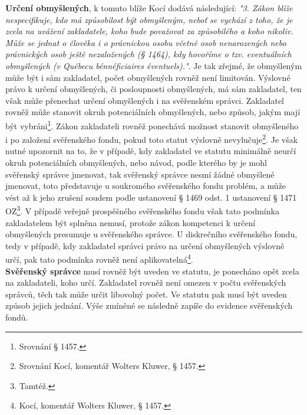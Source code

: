 \documentclass{article}
\begin{document}
\textbf{Určení obmyšlených}, k tomuto blíže Kocí dodává následující: \textit{"3. Zákon blíže nespecifikuje, kdo má způsobilost být obmyšleným, neboť se vychází z toho, že je zcela na uvážení zakladatele, koho bude považovat za způsobilého a koho nikoliv. Může se jednat o člověka i o právnickou osobu včetně osob nenarozených nebo právnických osob ještě nezaložených (§ 1464), kdy hovoříme o tzv. eventuálních obmyšlených (v Québecu bénnéficiaires éventuels)."}. Je tak zřejmé, že obmyšleným může být i sám zakladatel, počet obmyšlených rovněž není limitován. Výslovné právo k určení obmyšlených, či posloupnosti obmyšlených, má sám zakladatel, ten však může přenechat určení obmyšlených i na svěřenském správci. Zakladatel rovněž může stanovit okruh potenciálních obmyšlených, nebo způsob, jakým mají být vybráni\footnote{Srovnání § 1457.}. Zákon zakladateli rovněž ponechává možnost stanovit obmyšleného i po založení svěřenského fondu, pokud toto statut výslovně nevylučuje\footnote{Srovnání Kocí, komentář Wolters Kluwer, § 1457.}. Je však nutné upozornit na to, že v případě, kdy zakladatel ve statutu minimálně neurčí okruh potenciálních obmyšlených, nebo návod, podle kterého by je mohl svěřenský správce jmenovat, tak svěřenský správce nesmí žádné obmyšlené jmenovat, toto představuje u soukromého svěřenského fondu problém, a může vést až k jeho zrušení soudem podle ustanovení § 1469 odst. 1 ustanovení § 1471 OZ\footnote{Tamtéž.}. V případě veřejně prospěšného svěřenského fondu však tato podmínka zakladatelem být splněna nemusí, protože zákon kompetenci k určení obmyšlených presumuje u svěřenského správce. U diskrečního svěřenského fondu, tedy v případě, kdy zakladatel správci právo na určení obmyšlených výslovně určí, pak tato podmínka rovněž není aplikovatelná\footnote{Kocí, komentář Wolters Kluwer, § 1457.}.\\

\textbf{Svěřenský správce} musí rovněž být uveden ve statutu, je ponecháno opět zcela na zakladateli, koho určí. Zakladatel rovněž není omezen v počtu svěřenských správců, těch tak může určit libovolný počet. Ve statutu pak musí být uveden způsob jejich jednání. Výše zmíněné se následně zapíše do evidence svěřenských fondů.\\
 
\end{document}
